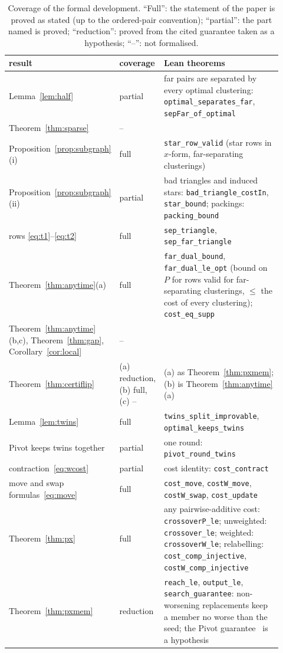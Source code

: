 \begin{table}[!tbp]
\centering
\caption{Coverage of the formal development.  ``Full'': the statement of the
paper is proved as stated (up to the ordered-pair convention); ``partial'':
the part named is proved; ``reduction'': proved from the cited guarantee
taken as a hypothesis; ``--'': not formalised.}\label{tab:lean}
\small
\begin{tabular}{p{0.33\linewidth}p{0.12\linewidth}p{0.47\linewidth}}
\toprule
result & coverage & Lean theorems \\
\midrule
Lemma~\ref{lem:half} & partial & far pairs are separated by every optimal clustering: \texttt{optimal\_separates\_far}, \texttt{sepFar\_of\_optimal} \\
Theorem~\ref{thm:sparse} & -- & \\
Proposition~\ref{prop:subgraph}(i) & full & \texttt{star\_row\_valid} (star rows in $x$-form, far-separating clusterings) \\
Proposition~\ref{prop:subgraph}(ii) & partial & bad triangles and induced stars: \texttt{bad\_triangle\_costIn}, \texttt{star\_bound}; packings: \texttt{packing\_bound} \\
rows \eqref{eq:t1}--\eqref{eq:t2} & full & \texttt{sep\_triangle}, \texttt{sep\_far\_triangle} \\
Theorem~\ref{thm:anytime}(a) & full & \texttt{far\_dual\_bound}, \texttt{far\_dual\_le\_opt} (bound on $P$ for rows valid for far-separating clusterings, $\le$ the cost of every clustering); \texttt{cost\_eq\_supp} \\
Theorem~\ref{thm:anytime}(b,c), Theorem~\ref{thm:gap}, Corollary~\ref{cor:local} & -- & \\
Theorem~\ref{thm:certiflip} & (a) reduction, (b) full, (c) -- & (a) as Theorem~\ref{thm:pxmem}; (b) is Theorem~\ref{thm:anytime}(a) \\
Lemma~\ref{lem:twins} & full & \texttt{twins\_split\_improvable}, \texttt{optimal\_keeps\_twins} \\
Pivot keeps twins together & partial & one round: \texttt{pivot\_round\_twins} \\
contraction~\eqref{eq:wcost} & partial & cost identity: \texttt{cost\_contract} \\
move and swap formulas~\eqref{eq:move} & full & \texttt{cost\_move}, \texttt{costW\_move}, \texttt{costW\_swap}, \texttt{cost\_update} \\
Theorem~\ref{thm:px} & full & any pairwise-additive cost: \texttt{crossoverP\_le}; unweighted: \texttt{crossover\_le}; weighted: \texttt{crossoverW\_le}; relabelling: \texttt{cost\_comp\_injective}, \texttt{costW\_comp\_injective} \\
Theorem~\ref{thm:pxmem} & reduction & \texttt{reach\_le}, \texttt{output\_le}, \texttt{search\_guarantee}: non-worsening replacements keep a member no worse than the seed; the Pivot guarantee~\citep{AilonCN08} is a hypothesis \\
\bottomrule
\end{tabular}
\end{table}

